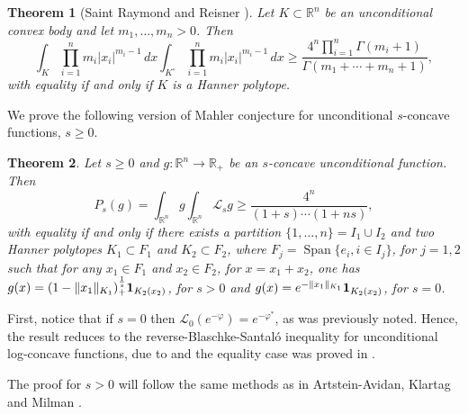 \documentclass[10pt]{amsart}
\newtheorem{thm}{Theorem}[section]
\theoremstyle{definition}
\theoremstyle{remark}
\newcommand{\R}{\mathbb{R}}
\renewcommand{\L}{\mathcal{L}}
\newcommand{\Span}{\operatorname{Span}}
\begin{document}
\begin{thm}[Saint Raymond  and Reisner ]
\label{thm:SR}
Let $K\subset\R^n$ be an unconditional convex body and let $m_1,\dots,m_n >0$. Then
$$
\int_K\prod_{i=1}^n m_i|x_i|^{m_i-1}\,dx\int_{K^\circ}\prod_{i=1}^n m_i|x_i|^{m_i-1}\,dx \ge \frac{4^n\prod_{i=1}^n\Gamma(m_i+1)}{\Gamma(m_1+\cdots+m_n+1)},
$$
with equality if and only if $K$ is a Hanner polytope.
\end{thm}
We prove the following version of Mahler conjecture for unconditional $s$-concave functions, $s\ge0$.

\begin{thm}\label{thm:s-concave-SR}
Let $s\ge0$ and $g:\R^n\to\R_+$ be an $s$-concave unconditional function.
Then
\[
P_s(g)=\int_{\R^n} g\int_{\R^n}\L_s g\ge\frac{4^n}{(1+s)\cdots(1+ns)},
\]
with equality if and only if there exists a partition $\{1,\dots,n\}=I_1\cup I_2$ and two Hanner polytopes $K_1\subset F_1$ and $K_2\subset F_2$, where $F_j=\Span\{e_i, i\in I_j\}$, for $j=1,2$  such that for any $x_1\in F_1$ and $x_2\in F_2$, for $x=x_1+x_2$, one has $g(x)=(1-\|x_1\|_{K_1})^\frac{1}{s}_+{\bf 1}_{K_2(x_2)}$, for $s>0$ and $g(x)=e^{-\|x_1\|_{K_1}}{\bf 1}_{K_2(x_2)}$, for $s=0$.
\end{thm}

First, notice that if $s=0$ then  $\L_0(e^{-\varphi})= e^{-\varphi^*}$, as was previously noted. Hence, the result reduces to the reverse-Blaschke-Santal\'o inequality for unconditional log-concave functions, due to \cite{fm08a, fm08b} and the equality case was proved in \cite{fgmr10}.



The proof for $s>0$ will follow the same methods as in Artstein-Avidan, Klartag and Milman \cite{AAKM05}.
\end{document}
